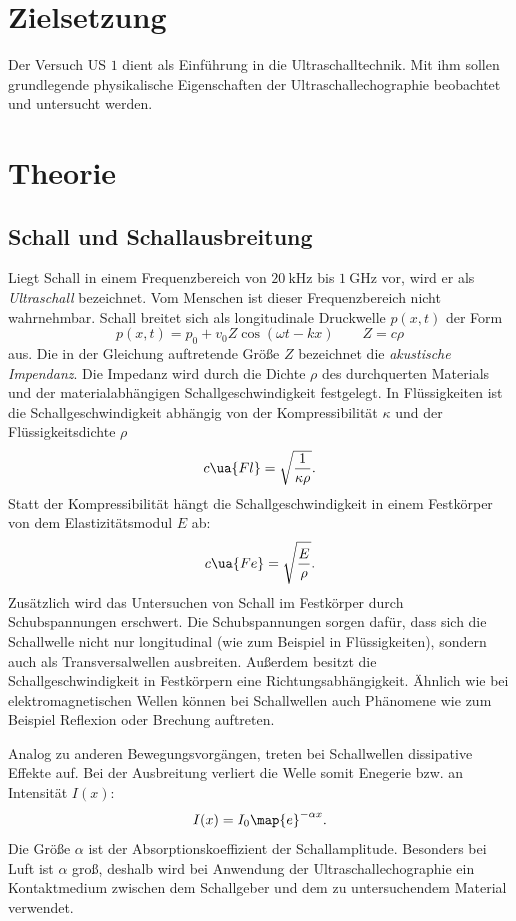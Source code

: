 \setcounter{page}{1}
\section*{Zielsetzung}
Der Versuch US $1$ dient als Einführung in die Ultraschalltechnik.
Mit ihm sollen grundlegende physikalische Eigenschaften der
Ultraschallechographie beobachtet und untersucht werden.
\section{Theorie}
\subsection{Schall und Schallausbreitung}
Liegt Schall in einem Frequenzbereich von $\SI{20}{\kilo\hertz}$ bis $\SI{1}{\giga\hertz}$ vor,
wird er als \emph{Ultraschall} bezeichnet. Vom Menschen ist dieser Frequenzbereich nicht wahrnehmbar.
Schall breitet sich als longitudinale Druckwelle $p(x,t)$ der Form
\begin{equation*}
  p(x,t)=p_0+v_0 Z \cos(\omega t - kx) \qquad Z=c\rho
\end{equation*}
aus. Die in der Gleichung auftretende Größe $Z$ bezeichnet die \emph{akustische Impendanz}.
Die Impedanz wird durch die Dichte $\rho$ des durchquerten Materials und der
materialabhängigen Schallgeschwindigkeit festgelegt.
In Flüssigkeiten ist die Schallgeschwindigkeit abhängig von der
Kompressibilität $\kappa$ und der Flüssigkeitsdichte $\rho$
\begin{equation*}
  c\ua{Fl}=\sqrt{\frac{1}{\kappa\rho}}.
\end{equation*}
Statt der Kompressibilität hängt die Schallgeschwindigkeit in einem Festkörper von
dem Elastizitätsmodul $E$ ab:
\begin{equation*}
  c\ua{Fe}=\sqrt{\frac{E}{\rho}}.
\end{equation*}
Zusätzlich wird das Untersuchen von Schall im Festkörper durch Schubspannungen
erschwert. Die Schubspannungen sorgen dafür, dass sich die Schallwelle nicht nur
longitudinal (wie zum Beispiel in Flüssigkeiten), sondern auch als %
Transversalwellen ausbreiten.
Außerdem besitzt die Schallgeschwindigkeit in Festkörpern eine Richtungsabhängigkeit. %
Ähnlich wie bei elektromagnetischen Wellen können bei Schallwellen auch
Phänomene wie zum Beispiel Reflexion oder Brechung auftreten.

Analog zu anderen Bewegungsvorgängen, treten bei Schallwellen dissipative Effekte auf.
Bei der Ausbreitung verliert die Welle somit Enegerie bzw. an Intensität $I(x)$:  %
\begin{equation}
  \label{eq:abfall}
  I(x)=I_0\map{e}^{-\alpha x}.
\end{equation}
Die Größe $\alpha$ ist der Absorptionskoeffizient der Schallamplitude.
Besonders bei Luft ist $\alpha$ groß, deshalb wird bei Anwendung der Ultraschallechographie
ein Kontaktmedium zwischen dem Schallgeber und dem zu untersuchendem Material verwendet.

